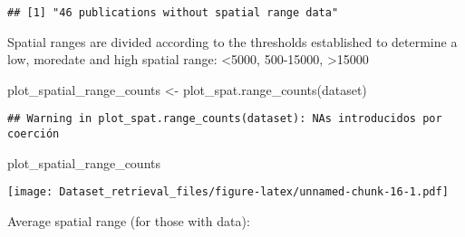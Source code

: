 \documentclass[
]{article}
\newenvironment{Shaded}{\begin{snugshade}}{\end{snugshade}}
\newcommand{\FunctionTok}[1]{\textcolor[rgb]{0.00,0.00,0.00}{#1}}
\newcommand{\NormalTok}[1]{#1}
\newcommand{\OtherTok}[1]{\textcolor[rgb]{0.56,0.35,0.01}{#1}}
\newcommand{\SpecialCharTok}[1]{\textcolor[rgb]{0.00,0.00,0.00}{#1}}
\newcommand{\StringTok}[1]{\textcolor[rgb]{0.31,0.60,0.02}{#1}}
\begin{document}
\begin{verbatim}
## [1] "46 publications without spatial range data"
\end{verbatim}

Spatial ranges are divided according to the thresholds established to
determine a low, moredate and high spatial range: \textless5000,
500-15000, \textgreater15000

\begin{Shaded}
\begin{Highlighting}[]
\NormalTok{plot\_spatial\_range\_counts }\OtherTok{\textless{}{-}} \FunctionTok{plot\_spat.range\_counts}\NormalTok{(dataset)}
\end{Highlighting}
\end{Shaded}

\begin{verbatim}
## Warning in plot_spat.range_counts(dataset): NAs introducidos por coerción
\end{verbatim}

\begin{Shaded}
\begin{Highlighting}[]
\NormalTok{plot\_spatial\_range\_counts}
\end{Highlighting}
\end{Shaded}

\texttt{[image: Dataset\_retrieval\_files/figure-latex/unnamed-chunk-16-1.pdf]}

Average spatial range (for those with data):

\begin{Shaded}
\end{Shaded}
\end{document}
